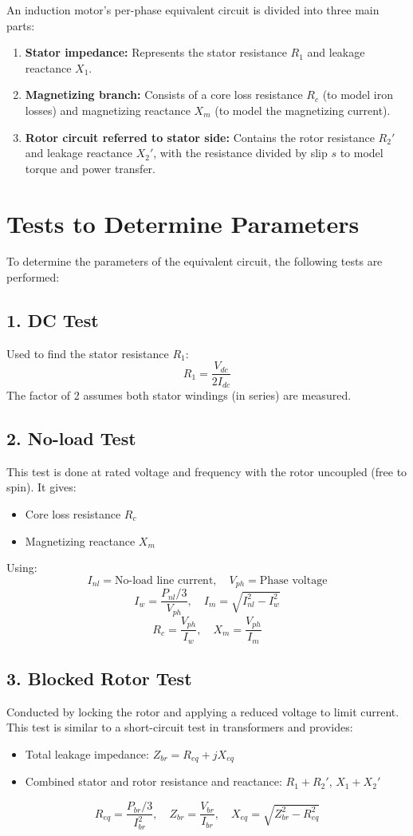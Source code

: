 \documentclass[a4paper,12pt]{article}
\begin{document}
	An induction motor’s per-phase equivalent circuit is divided into three main parts:
	\begin{enumerate}
		\item \textbf{Stator impedance:} Represents the stator resistance $R_1$ and leakage reactance $X_1$.
		\item \textbf{Magnetizing branch:} Consists of a core loss resistance $R_c$ (to model iron losses) and magnetizing reactance $X_m$ (to model the magnetizing current).
		\item \textbf{Rotor circuit referred to stator side:} Contains the rotor resistance $R_2'$ and leakage reactance $X_2'$, with the resistance divided by slip $s$ to model torque and power transfer.
	\end{enumerate}
	
	\section{Tests to Determine Parameters}
	
	To determine the parameters of the equivalent circuit, the following tests are performed:
	
	\subsection*{1. DC Test}
	Used to find the stator resistance $R_1$:
	\[
	R_1 = \frac{V_{dc}}{2I_{dc}}
	\]
	The factor of 2 assumes both stator windings (in series) are measured.
	
	\subsection*{2. No-load Test}
	This test is done at rated voltage and frequency with the rotor uncoupled (free to spin). It gives:
	\begin{itemize}
		\item Core loss resistance $R_c$
		\item Magnetizing reactance $X_m$
	\end{itemize}
	
	Using:
	\[
	I_{nl} = \text{No-load line current}, \quad V_{ph} = \text{Phase voltage}
	\]
	\[
	I_w = \frac{P_{nl}/3}{V_{ph}}, \quad I_m = \sqrt{I_{nl}^2 - I_w^2}
	\]
	\[
	R_c = \frac{V_{ph}}{I_w}, \quad X_m = \frac{V_{ph}}{I_m}
	\]
	
	\subsection*{3. Blocked Rotor Test}
	Conducted by locking the rotor and applying a reduced voltage to limit current. This test is similar to a short-circuit test in transformers and provides:
	\begin{itemize}
		\item Total leakage impedance: $Z_{br} = R_{eq} + jX_{eq}$
		\item Combined stator and rotor resistance and reactance: $R_1 + R_2'$, $X_1 + X_2'$
	\end{itemize}
	\[
	R_{eq} = \frac{P_{br}/3}{I_{br}^2}, \quad Z_{br} = \frac{V_{br}}{I_{br}}, \quad X_{eq} = \sqrt{Z_{br}^2 - R_{eq}^2}
	\]
	
\end{document}
